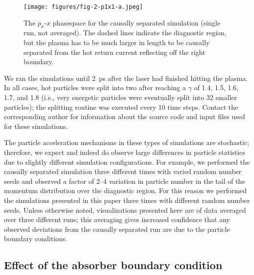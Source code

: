 \documentclass[../absorber.tex]{subfiles}
\begin{document}
\begin{figure}
\texttt{[image: figures/fig-2-p1x1-a.jpeg]}
\caption{\label{fig:px-x-a} The $p_x$-$x$ phasespace for the causally separated simulation (single run, not averaged).  The dashed lines indicate the diagnostic region, but the plasma has to be much larger in length to be causally separated from the hot return current reflecting off the right boundary.}
\end{figure}


We ran the simulations until 2~ps after the laser had finished hitting the plasma.  In all cases, hot particles were split into two after reaching a $\gamma$ of 1.4, 1.5, 1.6, 1.7, and 1.8 (i.e., very energetic particles were eventually split into 32 smaller particles); the splitting routine was executed every 10 time steps.  Contact the corresponding author for information about the source code and input files used for these simulations.

The particle acceleration mechanisms in these types of simulations are stochastic; therefore, we expect and indeed do observe large differences in particle statistics due to slightly different simulation configurations.  For example, we performed the causally separated simulation three different times with varied random number seeds and observed a factor of 2--4 variation in particle number in the tail of the momentum distribution over the diagnostic region.  For this reason we performed the simulations presented in this paper three times with different random number seeds.  Unless otherwise noted, visualizations presented here are of data averaged over three different runs; this averaging gives increased confidence that any observed deviations from the causally separated run are due to the particle boundary conditions.


\subsection{Effect of the absorber boundary condition}
\end{document}
